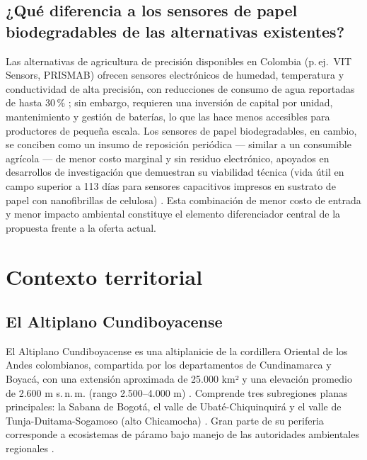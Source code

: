 \documentclass[11pt,a4paper]{article}
\begin{document}
\subsection{¿Qué diferencia a los sensores de papel biodegradables de las alternativas existentes?}
Las alternativas de agricultura de precisión disponibles en Colombia (p.\,ej.\ VIT Sensors, PRISMAB) ofrecen sensores electrónicos de humedad, temperatura y conductividad de alta precisión, con reducciones de consumo de agua reportadas de hasta 30\,\% \citep{vitsensors,prismab}; sin embargo, requieren una inversión de capital por unidad, mantenimiento y gestión de baterías, lo que las hace menos accesibles para productores de pequeña escala. Los sensores de papel biodegradables, en cambio, se conciben como un insumo de reposición periódica --- similar a un consumible agrícola --- de menor costo marginal y sin residuo electrónico, apoyados en desarrollos de investigación que demuestran su viabilidad técnica (vida útil en campo superior a 113 días para sensores capacitivos impresos en sustrato de papel con nanofibrillas de celulosa) \citep{sciencedirect2025paper}. Esta combinación de menor costo de entrada y menor impacto ambiental constituye el elemento diferenciador central de la propuesta frente a la oferta actual.

\section{Contexto territorial}
\label{sec:territorial}

\subsection{El Altiplano Cundiboyacense}
El Altiplano Cundiboyacense es una altiplanicie de la cordillera Oriental de los Andes colombianos, compartida por los departamentos de Cundinamarca y Boyacá, con una extensión aproximada de 25.000 km² y una elevación promedio de 2.600 m s.\,n.\,m. (rango 2.500--4.000 m) \citep{wikipedia_altiplano}. Comprende tres subregiones planas principales: la Sabana de Bogotá, el valle de Ubaté-Chiquinquirá y el valle de Tunja-Duitama-Sogamoso (alto Chicamocha) \citep{wikipedia_altiplano}. Gran parte de su periferia corresponde a ecosistemas de páramo bajo manejo de las autoridades ambientales regionales \citep{corpoboyaca_paramo}.
\end{document}
